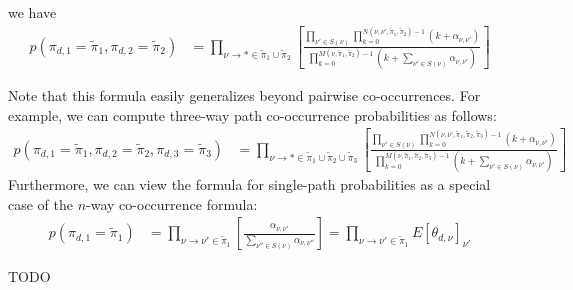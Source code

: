\documentclass{article}
\begin{document}
we have
\begin{align}
p(\pi_{d,1} = \tilde\pi_1, \pi_{d,2} = \tilde\pi_2)
&=
\prod_{\nu \to * \in \tilde\pi_1 \cup \tilde\pi_2}
\left[
\frac
  {
    \prod_{\nu' \in S(\nu)}
    \prod_{k=0}^{N(\nu,\nu',\tilde\pi_1,\tilde\pi_2) - 1}
    (k + \alpha_{\nu,\nu'})
  }
  {
    \prod_{k=0}^{M(\nu,\tilde\pi_1,\tilde\pi_2) - 1}
    \left(
      k + \sum_{\nu' \in S(\nu)}\alpha_{\nu,\nu'}
    \right)
  }
\right]
\end{align}

Note that this formula easily generalizes beyond pairwise co-occurrences.
For example, we can compute three-way path co-occurrence probabilities as follows:
\begin{align}
p(\pi_{d,1} = \tilde\pi_1, \pi_{d,2} = \tilde\pi_2, \pi_{d,3} = \tilde\pi_3)
&=
\prod_{\nu \to * \in \tilde\pi_1 \cup \tilde\pi_2 \cup \tilde\pi_3}
\left[
\frac
  {
    \prod_{\nu' \in S(\nu)}
    \prod_{k=0}^{N(\nu,\nu',\tilde\pi_1,\tilde\pi_2,\tilde\pi_3) - 1}
    (k + \alpha_{\nu,\nu'})
  }
  {
    \prod_{k=0}^{M(\nu,\tilde\pi_1,\tilde\pi_2,\tilde\pi_3) - 1}
    \left(
      k + \sum_{\nu' \in S(\nu)}\alpha_{\nu,\nu'}
    \right)
  }
\right]
\end{align}
Furthermore, we can view the formula for single-path probabilities as a special case of the $n$-way co-occurrence formula:
\begin{align}
p(\pi_{d,1} = \tilde\pi_1)
&=
\prod_{\nu \to \nu' \in \tilde\pi_1}
\left[
\frac
  {
    \alpha_{\nu,\nu'}
  }
  {
    \sum_{\nu'' \in S(\nu)}\alpha_{\nu,\nu''}
  }
\right]
=
\prod_{\nu \to \nu' \in \tilde\pi_1}
E[\theta_{d,\nu}]_{\nu'}
\end{align}

TODO
\end{document}
